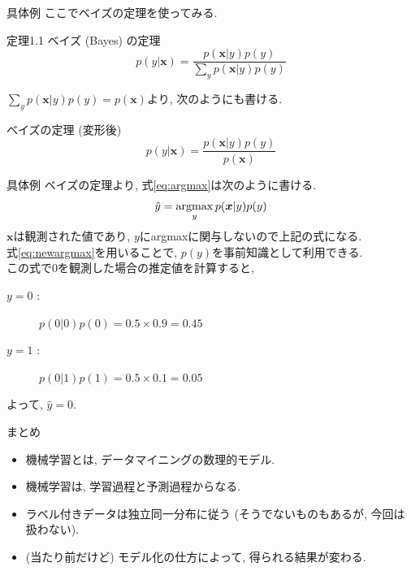 \documentclass[aspectratio=43, dvipdfmx, 12pt]{beamer}
\newcommand{\vek}[1]{\bm{#1}} %
\newcommand{\argmax}{\mathop{\rm argmax}\limits} %
\begin{document}
\begin{frame}{具体例}
  ここで\alert{ベイズの定理}を使ってみる.
  \begin{block}{定理1.1 ベイズ (Bayes) の定理}
    \[
      p(y|\vek{x}) = \frac{p(\vek{x}|y)p(y)}{\sum_{y}p(\vek{x}|y)p(y)}
    \]
  \end{block}
  $\sum_{y}p(\vek{x}|y)p(y) = p(\vek{x})$より, 次のようにも書ける.
  \begin{block}{ベイズの定理 (変形後)}
    \[
      p(y|\vek{x}) = \frac{p(\vek{x}|y)p(y)}{p(\vek{x})}
    \]
  \end{block}
\end{frame}

\begin{frame}{具体例}
  ベイズの定理より, 式\ref{eq:argmax}は次のように書ける.
  \begin{equation}
    \label{eq:newargmax}
    \hat{y} = \argmax_{y}p(\vek{x}|y)p(y)
  \end{equation}
  $\vek{x}$は観測された値であり, $y$にargmaxに関与しないので上記の式になる.\\
  式\ref{eq:newargmax}を用いることで, $p(y)$を事前知識として利用できる.\\
  この式で$0$を観測した場合の推定値を計算すると, 
  \begin{description}
    \item[$y=0$ :] $p(0|0)p(0) = 0.5 \times 0.9 = 0.45$
    \item[$y=1$ :] $p(0|1)p(1) = 0.5 \times 0.1 = 0.05$
  \end{description}
  よって, $\hat{y} = 0$.
\end{frame}

\begin{frame}{まとめ}
  \begin{itemize}
    \item 機械学習とは, データマイニングの数理的モデル.
    \item 機械学習は, 学習過程と予測過程からなる.
    \item ラベル付きデータは独立同一分布に従う (そうでないものもあるが, 今回は扱わない).
    \item (当たり前だけど) モデル化の仕方によって, 得られる結果が変わる.  
  \end{itemize}
\end{frame}
\end{document}
